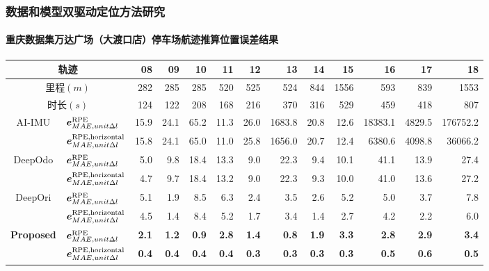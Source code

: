 \begin{frame} 
 	\frametitle{数据和模型双驱动定位方法研究}
 	\framesubtitle{重庆数据集万达广场（大渡口店）停车场航迹推算位置误差结果}
    {\footnotesize
    \setlength{\tabcolsep}{2pt}
		\begin{tabular*}{\linewidth}{@{\extracolsep{\fill}}clrrrrrrrrrrr}
			\toprule
			\multicolumn{2}{c}{轨迹} & 08 & 09 & 10 & 11 & 12 & 13 & 14 & 15 & 16 & 17 & 18 \\
			\midrule
			\multicolumn{2}{c}{里程$\left(\unit{m}\right)$} & 282  & 285  & 285  & 520  & 525  & 524  & 844  & 1556 & 593   & 839  & 1553   \\
			\multicolumn{2}{c}{时长$\left(\unit{s}\right)$} & 124  & 122  & 208  & 168  & 216  & 370  & 316  & 529  & 459   & 418  & 807    \\
			\multirow{2}{*}{AI-IMU} & $\vb*{e}^{\mathrm{RPE}}_{MAE,unit \Delta l}$ & 15.9 & 24.1 & 65.2 & 11.3 & 26.0 & 1683.8 & 20.8 & 12.6 & 18383.1 & 4829.5 & 176752.2 \\
			& $\vb*{e}^{\mathrm{RPE,horizontal}}_{MAE,unit \Delta l}$ & 15.8 & 24.1 & 65.0 & 11.0 & 25.8 & 1656.0 & 20.7 & 12.4 & 6380.6 & 4098.8 & 36066.2 \\
			\multirow{2}{*}{DeepOdo} & $\vb*{e}^{\mathrm{RPE}}_{MAE,unit \Delta l}$ & 5.0 & 9.8 & 18.4 & 13.3 & 9.0 & 22.3 & 9.4 & 10.1 & 41.1 & 13.9 & 27.4 \\
			& $\vb*{e}^{\mathrm{RPE,horizontal}}_{MAE,unit \Delta l}$ & 4.7 & 9.7 & 18.4 & 13.2 & 9.0 & 22.3 & 9.3 & 10.0 & 41.0 & 13.6 & 27.2 \\
			\multirow{2}{*}{DeepOri} & $\vb*{e}^{\mathrm{RPE}}_{MAE,unit \Delta l}$ & 5.1 & 1.9 & 8.5 & 6.3 & 2.4 & 3.5 & 2.6 & 5.2 & 5.0 & 3.7 & 7.8 \\
			& $\vb*{e}^{\mathrm{RPE,horizontal}}_{MAE,unit \Delta l}$ & 4.5 & 1.4 & 8.4 & 5.2 & 1.7 & 3.4 & 1.4 & 2.7 & 4.2 & 2.2 & 6.0 \\
			\multirow{2}{*}{\textbf{Proposed}} & $\vb*{e}^{\mathrm{RPE}}_{MAE,unit \Delta l}$ & \textbf{2.1} & \textbf{1.2} & \textbf{0.9} & \textbf{2.8} & \textbf{1.4} & \textbf{0.8} & \textbf{1.9} & \textbf{3.3} & \textbf{2.8} & \textbf{2.9} & \textbf{3.4} \\
			& $\vb*{e}^{\mathrm{RPE,horizontal}}_{MAE,unit \Delta l}$ & \textbf{0.4} & \textbf{0.4} & \textbf{0.4} & \textbf{0.4} & \textbf{0.3} & \textbf{0.3} & \textbf{0.3} & \textbf{0.3} & \textbf{0.5} & \textbf{0.6} & \textbf{0.5} \\
			\bottomrule 
		\end{tabular*}
	}	
\end{frame}

